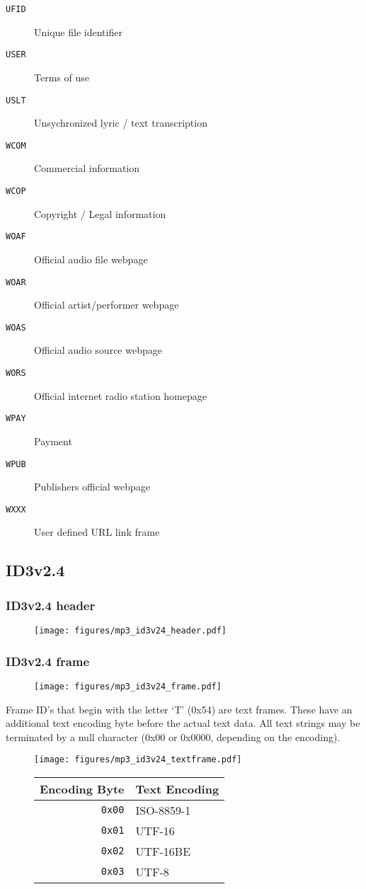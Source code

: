 \begin{multicols}{3}
{\begin{description}
\item[\texttt{UFID}] Unique file identifier
\item[\texttt{USER}] Terms of use
\item[\texttt{USLT}] Unsychronized lyric / text transcription
\item[\texttt{WCOM}] Commercial information
\item[\texttt{WCOP}] Copyright / Legal information
\item[\texttt{WOAF}] Official audio file webpage
\item[\texttt{WOAR}] Official artist/performer webpage
\item[\texttt{WOAS}] Official audio source webpage
\item[\texttt{WORS}] Official internet radio station homepage
\item[\texttt{WPAY}] Payment
\item[\texttt{WPUB}] Publishers official webpage
\item[\texttt{WXXX}] User defined URL link frame
\end{description}
}
\end{multicols}

\subsection{ID3v2.4}
\subsubsection{ID3v2.4 header}
\begin{figure}[h]
\texttt{[image: figures/mp3\_id3v24\_header.pdf]}
\end{figure}

\subsubsection{ID3v2.4 frame}
\begin{figure}[h]
\texttt{[image: figures/mp3\_id3v24\_frame.pdf]}
\end{figure}
\par
\noindent
Frame ID's that begin with the letter `T' (0x54) are text frames.
These have an additional text encoding byte before the actual
text data.
All text strings may be terminated by a null character
(0x00 or 0x0000, depending on the encoding).
\begin{figure}[h]
\texttt{[image: figures/mp3\_id3v24\_textframe.pdf]}
\begin{tabular}{r|l}
Encoding Byte & Text Encoding \\
\hline
\texttt{0x00} & ISO-8859-1 \\
\texttt{0x01} & UTF-16 \\
\texttt{0x02} & UTF-16BE \\
\texttt{0x03} & UTF-8
\end{tabular}
\end{figure}

